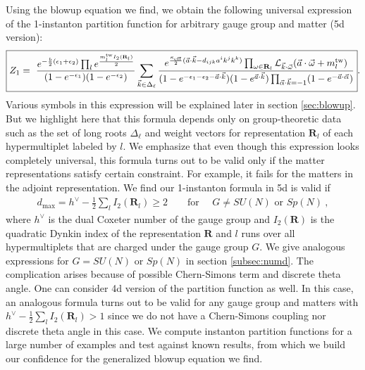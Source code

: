 \documentclass[letterpaper, 11pt]{article}
\def\CL{{\cal L}}
\def\e{\epsilon}
\def\w{\omega}
\def\half{\frac{1}{2}}
\begin{document}
Using the blowup equation we find, we obtain the following universal expression of the 1-instanton partition function for arbitrary gauge group and matter (5d version):
\begin{align}
\boxed{
  Z_1=\ \frac{e^{-\frac{b}{2}(\e_1 + \e_2)}\prod_{l}e^{\frac{m^\text{tw}_l I_2(\mathbf{R}_l)}{2}}}{(1-e^{-\e_1})(1-e^{-\e_2})} \sum_{\vec{k}\in\Delta_\ell}\frac{e^{\frac{\kappa_{\text{eff}}}{2}(\vec{a}\cdot\vec{k}-d_{ijk}a^ik^jk^k)}\prod_{\w \in \mathbf{R}_l} \CL_{\vec{k}\cdot\vec{\w}}(\vec{a}\cdot \vec{\w} + m_{l}^\text{tw})}{(1-e^{-\e_1-\e_2-\vec{a}\cdot\vec{k}})(1-e^{\vec{a}\cdot\vec{k}})\prod_{\vec{\alpha}\cdot \vec{k}=-1}(1-e^{-\vec{a}\cdot\vec{\alpha}})}}.
\end{align} 
Various symbols in this expression will be explained later in section \ref{sec:blowup}. But we highlight here that this formula depends only on group-theoretic data such as the set of long roots $\Delta_\ell$ and weight vectors for representation $\mathbf{R}_l$ of each hypermultiplet labeled by $l$. 
We emphasize that even though this expression looks completely universal, this formula turns out to be valid only if the matter representations satisfy certain constraint. For example, it fails for the matters in the adjoint representation. We find our 1-instanton formula in 5d is valid if 
\begin{align}
  d_\text{max} = h^\vee -\frac{1}{2}\sum_l I_2(\mathbf{R}_l) \ge 2 \qquad \textrm{for } \quad G \neq SU(N) \textrm{ or } Sp(N) \ ,
\end{align}
where $h^\vee$ is the dual Coxeter number of the gauge group and $I_2(\mathbf{R})$ is the quadratic Dynkin index of the representation $\mathbf{R}$ and $l$ runs over all hypermultiplets that are charged under the gauge group $G$. We give analogous expressions for $G=SU(N)$ or $Sp(N)$ in section \ref{subsec:numd}. The complication arises because of possible Chern-Simons term and discrete theta angle. One can consider 4d version of the partition function as well. In this case, an analogous formula turns out to be valid for any gauge group and matters with $h^\vee - \half \sum_l I_2(\mathbf{R}_l) >1$ since we do not have a Chern-Simons coupling nor discrete theta angle in this case. 
We compute instanton partition functions for a large number of examples and test against known results, from which we build our confidence for the generalized blowup equation we find. 
\end{document}
